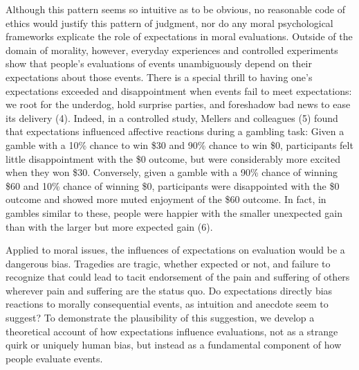 \documentclass[9pt,twocolumn,twoside,lineno]{pnas-new}
\begin{document}
Although this pattern seems so intuitive as to be obvious, no reasonable
code of ethics would justify this pattern of judgment, nor do any moral
psychological frameworks explicate the role of expectations in moral
evaluations. Outside of the domain of morality, however, everyday
experiences and controlled experiments show that people's evaluations of
events unambiguously depend on their expectations about those events.
There is a special thrill to having one's expectations exceeded and
disappointment when events fail to meet expectations: we root for the
underdog, hold surprise parties, and foreshadow bad news to ease its
delivery (4). Indeed, in a controlled study, Mellers and colleagues (5)
found that expectations influenced affective reactions during a gambling
task: Given a gamble with a 10\% chance to win \$30 and 90\% chance to
win \$0, participants felt little disappointment with the \$0 outcome,
but were considerably more excited when they won \$30. Conversely, given
a gamble with a 90\% chance of winning \$60 and 10\% chance of winning
\$0, participants were disappointed with the \$0 outcome and showed more
muted enjoyment of the \$60 outcome. In fact, in gambles similar to
these, people were happier with the smaller unexpected gain than with
the larger but more expected gain (6).

Applied to moral issues, the influences of expectations on evaluation
would be a dangerous bias. Tragedies are tragic, whether expected or
not, and failure to recognize that could lead to tacit endorsement of
the pain and suffering of others wherever pain and suffering are the
status quo. Do expectations directly bias reactions to morally
consequential events, as intuition and anecdote seem to suggest? To
demonstrate the plausibility of this suggestion, we develop a
theoretical account of how expectations influence evaluations, not as a
strange quirk or uniquely human bias, but instead as a fundamental
component of how people evaluate events.
\end{document}

